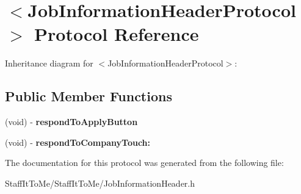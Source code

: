\hypertarget{protocol_job_information_header_protocol-p}{
\section{$<$\-Job\-Information\-Header\-Protocol$>$ \-Protocol \-Reference}
\label{protocol_job_information_header_protocol-p}
}


\-Inheritance diagram for $<$\-Job\-Information\-Header\-Protocol$>$\-:
\subsection*{\-Public \-Member \-Functions}
\begin{DoxyCompactItemize}
\item 
\hypertarget{protocol_job_information_header_protocol-p_a3f6eb5342b669300dbcd11928577de1d}{
(void) -\/ {\bfseries respond\-To\-Apply\-Button}}
\label{protocol_job_information_header_protocol-p_a3f6eb5342b669300dbcd11928577de1d}

\item 
\hypertarget{protocol_job_information_header_protocol-p_aed50b06470c33533f5def8e63eb4a89e}{
(void) -\/ {\bfseries respond\-To\-Company\-Touch\-:}}
\label{protocol_job_information_header_protocol-p_aed50b06470c33533f5def8e63eb4a89e}

\end{DoxyCompactItemize}


\-The documentation for this protocol was generated from the following file\-:\begin{DoxyCompactItemize}
\item 
\-Staff\-It\-To\-Me/\-Staff\-It\-To\-Me/\-Job\-Information\-Header.\-h\end{DoxyCompactItemize}
